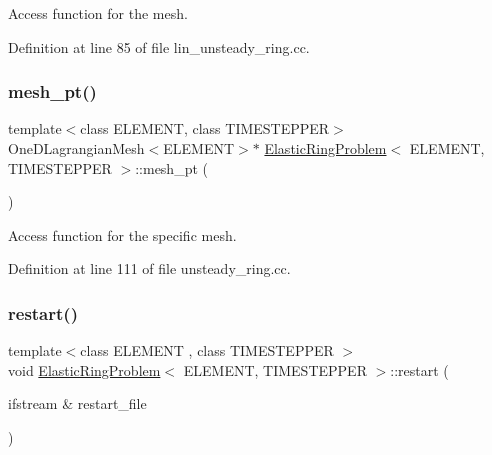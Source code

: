 Access function for the mesh. 



Definition at line 85 of file lin\+\_\+unsteady\+\_\+ring.\+cc.

\mbox{\label{classElasticRingProblem_a763200d4985bca4a120f2be2a217f4a8}} 
\subsubsection{\texorpdfstring{mesh\+\_\+pt()}{mesh\_pt()}\hspace{0.1cm}{\footnotesize\ttfamily [2/2]}}
{\footnotesize\ttfamily template$<$class E\+L\+E\+M\+E\+NT, class T\+I\+M\+E\+S\+T\+E\+P\+P\+ER$>$ \\
One\+D\+Lagrangian\+Mesh$<$E\+L\+E\+M\+E\+NT$>$$\ast$ \hyperlink{classElasticRingProblem}{Elastic\+Ring\+Problem}$<$ E\+L\+E\+M\+E\+NT, T\+I\+M\+E\+S\+T\+E\+P\+P\+ER $>$\+::mesh\+\_\+pt (\begin{DoxyParamCaption}{ }\end{DoxyParamCaption})\hspace{0.3cm}{\ttfamily [inline]}}



Access function for the specific mesh. 



Definition at line 111 of file unsteady\+\_\+ring.\+cc.

\mbox{\label{classElasticRingProblem_a0b7d864f52a18bb2a9f3a2378d8b02aa}} 
\subsubsection{\texorpdfstring{restart()}{restart()}}
{\footnotesize\ttfamily template$<$class E\+L\+E\+M\+E\+NT , class T\+I\+M\+E\+S\+T\+E\+P\+P\+ER $>$ \\
void \hyperlink{classElasticRingProblem}{Elastic\+Ring\+Problem}$<$ E\+L\+E\+M\+E\+NT, T\+I\+M\+E\+S\+T\+E\+P\+P\+ER $>$\+::restart (\begin{DoxyParamCaption}\item[{ifstream \&}]{restart\+\_\+file }\end{DoxyParamCaption})}



